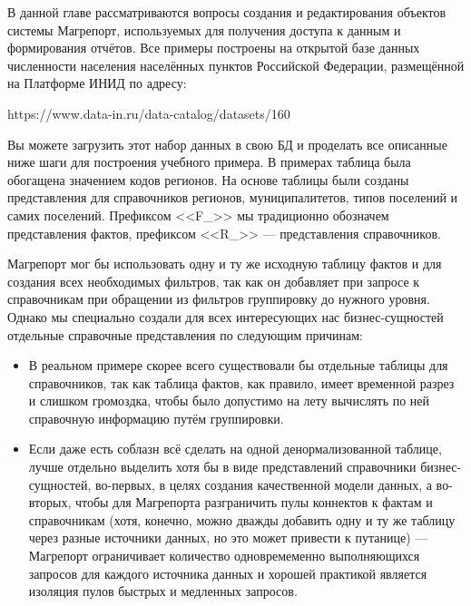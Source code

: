 \documentclass[../user-manual.tex]{subfiles}
\begin{document}
	
	В данной главе рассматриваются вопросы создания и редактирования объектов системы Магрепорт, используемых для получения доступа к данным и формирования отчётов. Все примеры построены на открытой базе данных численности населения населённых пунктов Российской Федерации, размещённой на Платформе ИНИД по адресу:
	
	\begin{boxed}
		https://www.data-in.ru/data-catalog/datasets/160
	\end{boxed}
	
	Вы можете загрузить этот набор данных в свою БД и проделать все описанные ниже шаги для построения учебного примера. В примерах таблица была обогащена значением кодов регионов. На основе таблицы были созданы представления для справочников регионов, муниципалитетов, типов поселений и самих поселений. Префиксом <<F\_>> мы традиционно обозначем представления фактов, префиксом <<R\_>> --- представления справочников.
	
	\begin{concept}
		Магрепорт мог бы использовать одну и ту же исходную таблицу фактов и для создания всех необходимых фильтров, так как он добавляет при запросе к справочникам при обращении из фильтров группировку до нужного уровня. Однако мы специально создали для всех интересующих нас бизнес-сущностей отдельные справочные представления по следующим причинам:
		
		\begin{itemize}
			\item В реальном примере скорее всего существовали бы отдельные таблицы для справочников, так как таблица фактов, как правило, имеет временной разрез и слишком громоздка, чтобы было допустимо на лету вычислять по ней справочную информацию путём группировки.
			
			\item Если даже есть соблазн всё сделать на одной денормализованной таблице, лучше отдельно выделить хотя бы в виде представлений справочники бизнес-сущностей, во-первых, в целях создания качественной модели данных, а во-вторых, чтобы для Магрепорта разграничить пулы коннектов к фактам и справочникам (хотя, конечно, можно дважды добавить одну и ту же таблицу через разные источники данных, но это может привести к путанице) --- Магрепорт ограничивает количество одновремеменно выполняющихся запросов для каждого источника данных и хорошей практикой является изоляция пулов быстрых и медленных запросов.
		\end{itemize}
	\end{concept}
\end{document}
